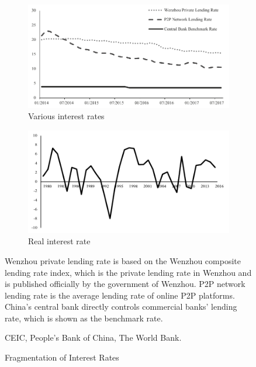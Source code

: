 \documentclass[AER]{AEA}
\begin{document}
\begin{figure}[!htb]
\centering
\begin{subfigure}{.5\textwidth}
\centering
\includegraphics[scale=.5]{fig/lrate.pdf}
\caption{Various interest rates}
\label{fig:lrate}
\end{subfigure}%
\begin{subfigure}{.5\textwidth}
\centering
\includegraphics[scale=.5]{fig/realr.pdf}
\caption{Real interest rate}
\label{fig:realr}
\end{subfigure}
\caption{Fragmentation of Interest Rates}
\begin{figurenotes}
Wenzhou private lending rate is based on the Wenzhou composite lending rate index,
which is the private lending rate in Wenzhou and is published officially by the 
government of Wenzhou. P2P network lending rate is the average lending rate of 
online P2P platforms. China's central bank directly controls commercial banks' 
lending rate, which is shown as the benchmark rate.
\end{figurenotes}
\begin{figurenotes}[Source]
CEIC, People's Bank of China, The World Bank.
\end{figurenotes}
\end{figure}
\end{document}
